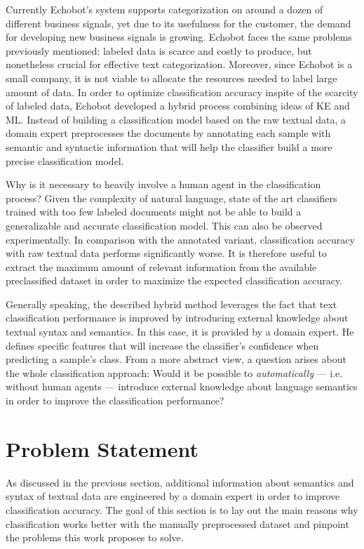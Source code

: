 Currently Echobot's system supports categorization on around a dozen of 
different business signals, yet due to its usefulness for the customer, the
demand for developing new business signals is growing. Echobot faces the same
problems previously mentioned: labeled data is scarce and costly to produce,
but nonetheless crucial for effective text categorization.
Moreover, since Echobot is a small company, it is not viable to allocate the 
resources needed to label large amount of data. In order to optimize
classification accuracy inspite of the scarcity of labeled data, Echobot developed 
a hybrid process combining ideas of KE and ML. Instead of building a
classification model based on the raw textual data, a domain expert
preprocesses the documents by annotating each sample with semantic and
syntactic information that will help the classifier build a more precise
classification model.

Why is it necessary to heavily involve a human agent in the classification
process? Given the complexity of natural language, state of the art
classifiers trained with too few labeled documents might not be able to build a
generalizable and accurate classification model. This can also be observed
experimentally. In comparison with the annotated variant, classification
accuracy with raw textual data performs significantly worse.
It is therefore useful to extract the maximum amount of relevant information 
from the available preclassified dataset in order to maximize the expected
classification accuracy.

Generally speaking, the described hybrid method leverages the fact that text
classification performance is improved by introducing external knowledge
about textual syntax and semantics. In this case, it is provided by a domain expert.
He defines specific features that will increase the classifier's confidence when
predicting a sample's class.
From a more abstract view, a question arises about the whole classification
approach: Would it be possible to \textit{automatically} --- i.e. without human
agents --- introduce external knowledge about language semantics in order to
improve the classification performance?  

\section{Problem Statement}

 As discussed in the previous section, additional information about semantics
 and syntax of textual data are engineered by a domain expert in order to
 improve classification accuracy. The goal of this section is to lay out the
 main reasons why classification works better with the manually preprocessed
 dataset and pinpoint the problems this work proposes to solve.
 
